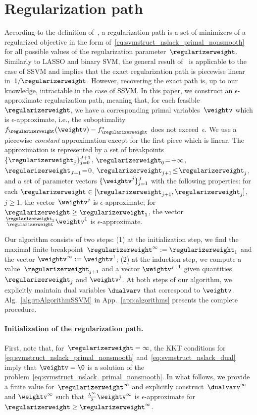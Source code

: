 \documentclass{article}
\begin{document}
\section{Regularization path \label{sec:reg_path}}
According to the definition of~\citet{EfronRegPathLasso_04}, a regularization path is a set of minimizers of a regularized objective in the form of~\eqref{eq:svmstruct_nslack_primal_nonsmooth} for all possible values of the regularization parameter~$\regularizerweight$.
%
Similarly to LASSO and binary SVM, the general result of~\citet[Proposition~1]{Rosset07_regPathTheory} is applicable to the case of SSVM and implies that the exact regularization path is piecewise linear in~$1/\regularizerweight$.
However, recovering the exact path is, up to our knowledge, intractable in the case of SSVM.
%
In this paper, we construct an $\epsilon$-approximate regularization path, meaning that, for each feasible~$\regularizerweight$, we have a corresponding primal variables~$\weightv$ which is $\epsilon$-approximate, i.e., the suboptimality $f_{\regularizerweight}(\weightv) - f_{\regularizerweight}^*$ does not exceed~$\epsilon$. 
We use a piecewise \emph{constant} approximation except for the first piece which is linear. 
The approximation is represented by a set of breakpoints~$\{\regularizerweight_j\}_{j=0}^{J+1}$, $\regularizerweight_0 \!=\! +\infty$, $\regularizerweight_{J+1} \!=\! 0$, $\regularizerweight_{j+1} \!\leq\! \regularizerweight_j$, and a set of parameter vectors $\{\weightv^{j}\}_{j=1}^{J}$ with the following properties: for each $\regularizerweight \in [\regularizerweight_{j+1}, \regularizerweight_{j}]$, $j \geq 1$, the vector~$\weightv^{j}$ is $\epsilon$-approximate; for $\regularizerweight \geq \regularizerweight_{1}$, the vector $\frac{\regularizerweight_1}{\regularizerweight}\weightv^{1}$ is $\epsilon$-approximate.

Our algorithm consists of two steps:
(1) at the initialization step, we find the maximal finite breakpoint~$\regularizerweight^\infty := \regularizerweight_{1}$ and the vector $\weightv^\infty:=\weightv^{1}$;
(2) at the induction step, we compute a value~$\regularizerweight_{j+1}$ and a vector $\weightv^{j+1}$ given quantities~$\regularizerweight_{j}$ and $\weightv^{j}$. 
At both steps of our algorithm, we explicitly maintain dual variables $\dualvarv$ that correspond to $\weightv$.
Alg.~\ref{alg:rpAlgorithmSSVM} in App.~\ref{app:algorithms} presents the complete procedure.

%
 
\paragraph{Initialization of the regularization path.}
First, note that, for~$\regularizerweight = \infty$, the KKT conditions for \eqref{eq:svmstruct_nslack_primal_nonsmooth} and~\eqref{eq:svmstruct_nslack_dual} imply that $\weightv=\0$ is a solution of the problem~\eqref{eq:svmstruct_nslack_primal_nonsmooth}.
In what follows, we provide a finite value for~$\regularizerweight^\infty$ and explicitly construct~$\dualvarv^\infty$ and $\weightv^\infty$ such that $\frac{\lambda^\infty}{\lambda}\weightv^\infty$ is $\epsilon$-approximate for~$\regularizerweight \geq \regularizerweight^\infty$.
\end{document}
